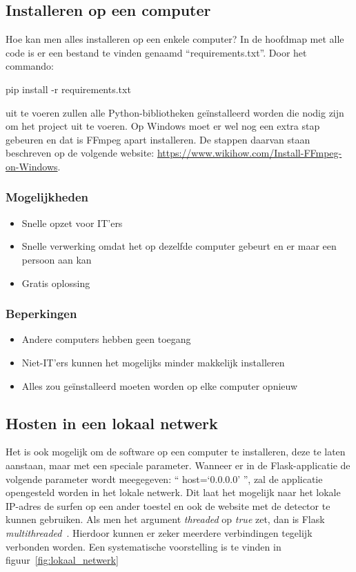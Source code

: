 \subsection{Installeren op een computer}
Hoe kan men alles installeren op een enkele computer?
In de hoofdmap met alle code is er een bestand te vinden genaamd ``requirements.txt''. Door het commando:
\begin{python}
    pip install -r requirements.txt
\end{python}
uit te voeren zullen alle Python-bibliotheken geïnstalleerd worden die nodig zijn om het project uit te voeren. Op Windows moet er wel nog een extra stap gebeuren en dat is FFmpeg apart installeren. De stappen daarvan staan beschreven op de volgende website: \url{https://www.wikihow.com/Install-FFmpeg-on-Windows}.

\subsubsection{Mogelijkheden}
\begin{itemize}
    \item Snelle opzet voor IT'ers
    \item Snelle verwerking omdat het op dezelfde computer gebeurt en er maar een persoon aan kan
    \item Gratis oplossing
\end{itemize}
\subsubsection{Beperkingen}
\begin{itemize}
    \item Andere computers hebben geen toegang
    \item Niet-IT'ers kunnen het mogelijks minder makkelijk installeren
    \item Alles zou geïnstalleerd moeten worden op elke computer opnieuw
\end{itemize}

\subsection{Hosten in een lokaal netwerk}
Het is ook mogelijk om de software op een computer te installeren, deze te laten aanstaan, maar met een speciale parameter. Wanneer er in de Flask-applicatie de volgende parameter wordt meegegeven: `` host=`0.0.0.0' '', zal de applicatie opengesteld worden in het lokale netwerk. Dit laat het mogelijk naar het lokale IP-adres de surfen op een ander toestel en ook de website met de detector te kunnen gebruiken. Als men het argument \textit{threaded} op \textit{true} zet, dan is Flask \textit{multithreaded}~\autocite{Vieira2013}. Hierdoor kunnen er zeker meerdere verbindingen tegelijk verbonden worden. Een systematische voorstelling is te vinden in figuur~\ref{fig:lokaal_netwerk}

